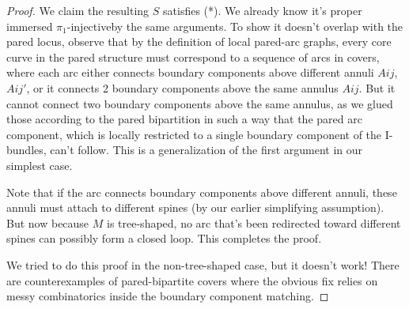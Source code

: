 \documentclass[12pt]{amsart}
\theoremstyle{definition}
\newcommand{\piinj}{$\pi_1$-injective}
\begin{document}
\begin{proof}
We claim the resulting $S$ satisfies (*). We already know it's proper immersed
\piinj by the same arguments. To show it doesn't overlap with the pared
locus, observe that by the definition of local pared-arc graphs, every core
curve in the pared structure must correspond to a sequence of arcs in covers,
where each arc either connects boundary components above different annuli $Aij$,
$Aij'$, or it connects 2 boundary components above the same annulus $Aij$. But it
cannot connect two boundary components above the same annulus, as we glued
those according to the pared bipartition in such a way that the pared arc
component, which is locally restricted to a single boundary component of the
I-bundles, can't follow. This is a generalization of the first argument in our
simplest case.

Note that if the arc connects boundary components above different annuli, these
annuli must attach to different spines (by our earlier simplifying assumption).
But now because $M$ is tree-shaped, no arc that's been redirected toward
different spines can possibly form a closed loop. This completes the proof.

We tried to do this proof in the non-tree-shaped case, but it doesn't work!
There are counterexamples of pared-bipartite covers where the obvious fix
relies on messy combinatorics inside the boundary component matching.


\end{proof}
\end{document}
